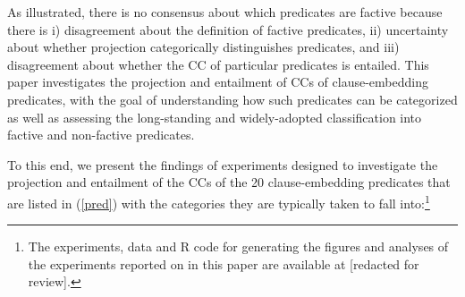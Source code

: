 \documentclass[11pt,fleqn]{article}
\newcommand{\6}{\mbox{$[\hspace*{-.6mm}[$}}
\newcommand{\9}{\mbox{$]\hspace*{-.6mm}]$}}
\begin{document}
As illustrated, there is no consensus about which predicates are factive because there is i) disagreement about the definition of factive predicates, ii) uncertainty about whether projection categorically distinguishes predicates, and iii) disagreement about whether the CC of particular predicates is entailed. This paper investigates the projection and entailment of CCs of clause-embedding predicates, with the goal of understanding how such predicates can be categorized as well as assessing the long-standing and widely-adopted classification into factive and non-factive predicates.

To this end, we present the findings of experiments designed to investigate the projection and entailment of the CCs of the 20 clause-embedding predicates  that are listed in (\ref{pred}) with the categories they are typically taken to fall into:\footnote{\label{f-github}The experiments, data and R code for generating the figures and analyses of the experiments reported on in this paper are available at [redacted for review].}
\end{document}
